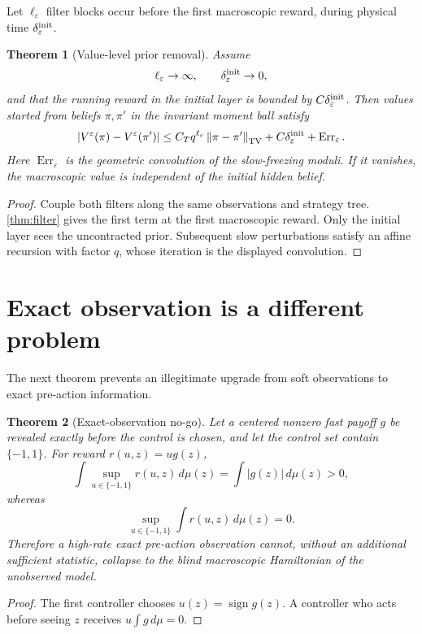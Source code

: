 \documentclass[11pt,reqno]{amsart}
\newtheorem{theorem}{Theorem}[section]
\theoremstyle{definition}
\theoremstyle{remark}
\newcommand{\norm}[1]{\left\lVert #1\right\rVert}
\newcommand{\abs}[1]{\left\lvert #1\right\rvert}
\begin{document}
Let $\ell_\varepsilon$ filter blocks occur before the first macroscopic reward,
during physical time $\delta_\varepsilon^{\rm init}$.

\begin{theorem}[Value-level prior removal]\label{thm:prior}
Assume
\[
 \ell_\varepsilon\to\infty,\qquad
 \delta_\varepsilon^{\rm init}\to0,
\]
and that the running reward in the initial layer is bounded by
$C\delta_\varepsilon^{\rm init}$.  Then values started from beliefs
$\pi,\pi'$ in the invariant moment ball satisfy
\[
 \abs{V^\varepsilon(\pi)-V^\varepsilon(\pi')}
 \le
 C_Tq^{\ell_\varepsilon}
 \norm{\pi-\pi'}_{\rm TV}
 +C\delta_\varepsilon^{\rm init}
 +\operatorname{Err}_\varepsilon.
\]
Here $\operatorname{Err}_\varepsilon$ is the geometric convolution of the
slow-freezing moduli.  If it vanishes, the macroscopic value is independent of
the initial hidden belief.
\end{theorem}

\begin{proof}
Couple both filters along the same observations and strategy tree.
\cref{thm:filter} gives the first term at the first macroscopic reward.
Only the initial layer sees the uncontracted prior.  Subsequent slow
perturbations satisfy an affine recursion with factor $q$, whose iteration is
the displayed convolution.
\end{proof}

\section{Exact observation is a different problem}\label{sec:no-go}

The next theorem prevents an illegitimate upgrade from soft observations to
exact pre-action information.

\begin{theorem}[Exact-observation no-go]\label{thm:exact-no-go}
Let a centered nonzero fast payoff $g$ be revealed exactly before the control
is chosen, and let the control set contain $\{-1,1\}$.  For reward
$r(u,z)=ug(z)$,
\[
 \int\sup_{u\in\{-1,1\}}r(u,z)\,d\mu(z)
 =
 \int\abs{g(z)}\,d\mu(z)>0,
\]
whereas
\[
 \sup_{u\in\{-1,1\}}\int r(u,z)\,d\mu(z)=0.
\]
Therefore a high-rate exact pre-action observation cannot, without an
additional sufficient statistic, collapse to the blind macroscopic
Hamiltonian of the unobserved model.
\end{theorem}

\begin{proof}
The first controller chooses $u(z)=\operatorname{sign}g(z)$.  A controller
who acts before seeing $z$ receives $u\int g\,d\mu=0$.
\end{proof}
\end{document}
